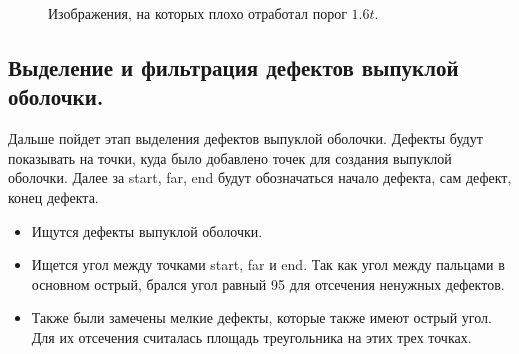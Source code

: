 \documentclass[12pt,fleqn]{article}
\begin{document}
\begin{figure}[h]
\begin{minipage}[h]{0.49\linewidth}
\end{minipage}
\caption{Изображения, на которых плохо отработал порог $1.6t$.}
\label{Image2}
\end{figure}

\subsection{Выделение и фильтрация дефектов выпуклой оболочки.}

Дальше пойдет этап выделения дефектов выпуклой оболочки. Дефекты будут показывать на точки, куда было добавлено точек для создания выпуклой оболочки. Далее за start, far, end будут обозначаться начало дефекта, сам дефект, конец дефекта.

\begin{itemize}
\item Ищутся дефекты выпуклой оболочки.
\item Ищется угол между точками start, far и end. Так как угол между пальцами в основном острый, брался угол равный 95 для отсечения ненужных дефектов.
\item Также были замечены мелкие дефекты, которые также имеют острый угол. Для их отсечения считалась площадь треугольника на этих трех точках.
\end{itemize} 
\end{document}
